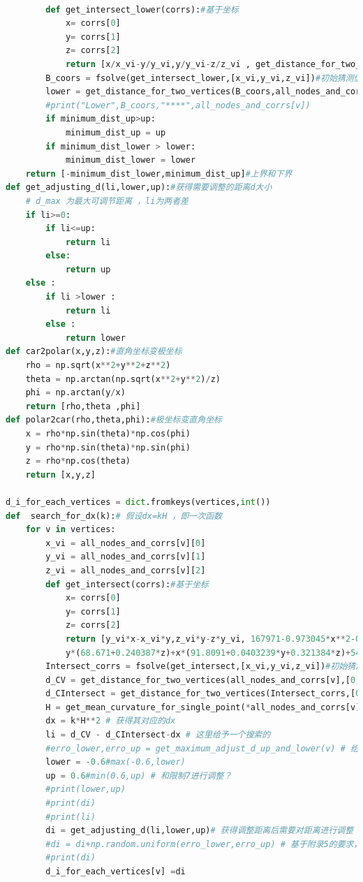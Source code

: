 \documentclass[withoutpreface,bwprint]{cumcmthesis} %
\begin{document}
\begin{appendices}
\begin{lstlisting}[language=python]
        
        def get_intersect_lower(corrs):#基于坐标
            x= corrs[0]
            y= corrs[1]
            z= corrs[2]
            return [x/x_vi-y/y_vi,y/y_vi-z/z_vi , get_distance_for_two_vertices([x,y,z],all_nodes_and_corrs[v_adjacent])-Wij*(1+0.0007)]
        B_coors = fsolve(get_intersect_lower,[x_vi,y_vi,z_vi])#初始猜测值[0,-1]
        lower = get_distance_for_two_vertices(B_coors,all_nodes_and_corrs[v])
        #print("Lower",B_coors,"****",all_nodes_and_corrs[v])
        if minimum_dist_up>up:
            minimum_dist_up = up
        if minimum_dist_lower > lower:
            minimum_dist_lower = lower 
    return [-minimum_dist_lower,minimum_dist_up]#上界和下界
def get_adjusting_d(li,lower,up):#获得需要调整的距离d大小
    # d_max 为最大可调节距离 ，li为两者差
    if li>=0:
        if li<=up:
            return li
        else:
            return up
    else :
        if li >lower :
            return li
        else :
            return lower 
def car2polar(x,y,z):#直角坐标变极坐标
    rho = np.sqrt(x**2+y**2+z**2)
    theta = np.arctan(np.sqrt(x**2+y**2)/z)
    phi = np.arctan(y/x)
    return [rho,theta ,phi]
def polar2car(rho,theta,phi):#极坐标变直角坐标
    x = rho*np.sin(theta)*np.cos(phi)
    y = rho*np.sin(theta)*np.sin(phi)
    z = rho*np.cos(theta)
    return [x,y,z]

d_i_for_each_vertices = dict.fromkeys(vertices,int())
def  search_for_dx(k):# 假设dx=kH ，即一次函数
    for v in vertices:
        x_vi = all_nodes_and_corrs[v][0]
        y_vi = all_nodes_and_corrs[v][1]
        z_vi = all_nodes_and_corrs[v][2]
        def get_intersect(corrs):#基于坐标
            x= corrs[0]
            y= corrs[1]
            z= corrs[2]
            return [y_vi*x-x_vi*y,z_vi*y-z*y_vi, 167971-0.973045*x**2-0.984919*y**2+
            y*(68.671+0.240387*z)+x*(91.8091+0.0403239*y+0.321384*z)+547.321*z-0.0420355*z**2]
        Intersect_corrs = fsolve(get_intersect,[x_vi,y_vi,z_vi])#初始猜测值[0,-1]
        d_CV = get_distance_for_two_vertices(all_nodes_and_corrs[v],[0,0,0])
        d_CIntersect = get_distance_for_two_vertices(Intersect_corrs,[0,0,0])
        H = get_mean_curvature_for_single_point(*all_nodes_and_corrs[v]) # 获得其对应的曲率
        dx = k*H**2 # 获得其对应的dx 
        li = d_CV - d_CIntersect-dx # 这里给予一个搜索的 
        #erro_lower,erro_up = get_maximum_adjust_d_up_and_lower(v) # 给予一个随机误差的范围
        lower = -0.6#max(-0.6,lower)
        up = 0.6#min(0.6,up) # 和限制7进行调整？
        #print(lower,up)
        #print(di)
        #print(li)
        di = get_adjusting_d(li,lower,up)# 获得调整距离后需要对距离进行调整
        #di = di+np.random.uniform(erro_lower,erro_up) # 基于附录5的要求，给予一个误差
        #print(di)
        d_i_for_each_vertices[v] =di 
        

\end{lstlisting}
\end{appendices}
\end{document}
